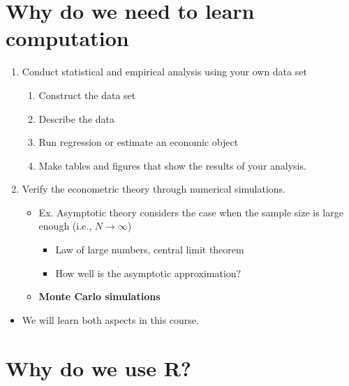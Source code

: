 \documentclass[]{book}
\providecommand{\tightlist}{%
  \setlength{\itemsep}{0pt}\setlength{\parskip}{0pt}}
\begin{document}
\hypertarget{why-do-we-need-to-learn-computation}{%
\section{Why do we need to learn computation}\label{why-do-we-need-to-learn-computation}}

\begin{enumerate}
\def\labelenumi{\arabic{enumi}.}
\tightlist
\item
  Conduct statistical and empirical analysis using your own data set

  \begin{enumerate}
  \def\labelenumii{\arabic{enumii}.}
  \tightlist
  \item
    Construct the data set
  \item
    Describe the data
  \item
    Run regression or estimate an economic object
  \item
    Make tables and figures that show the results of your analysis.
  \end{enumerate}
\item
  Verify the econometric theory through numerical simulations.

  \begin{itemize}
  \tightlist
  \item
    Ex. Asymptotic theory considers the case when the sample size is large enough (i.e., \(N \rightarrow \infty\))

    \begin{itemize}
    \tightlist
    \item
      Law of large numbers, central limit theorem
    \item
      How well is the asymptotic approximation?
    \end{itemize}
  \item
    \textbf{Monte Carlo simulations}
  \end{itemize}
\end{enumerate}

\begin{itemize}
\tightlist
\item
  We will learn both aspects in this course.
\end{itemize}

\hypertarget{why-do-we-use-r}{%
\section{Why do we use R?}\label{why-do-we-use-r}}
\end{document}
